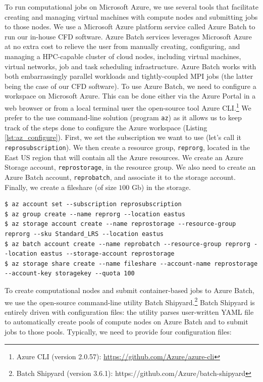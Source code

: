 \documentclass[10pt,journal,compsoc]{IEEEtran}
\begin{document}
To run computational jobs on Microsoft Azure, we use several tools that facilitate creating and managing virtual machines with compute nodes and submitting jobs to those nodes.
We use a Microsoft Azure platform service called Azure Batch to run our in-house CFD software.
Azure Batch services leverages Microsoft Azure at no extra cost to relieve the user from manually creating, configuring, and managing a HPC-capable cluster of cloud nodes, including virtual machines, virtual networks, job and task scheduling infrastructure.
Azure Batch works with both embarrassingly parallel workloads and tightly-coupled MPI jobs (the latter being the case of our CFD software).
To use Azure Batch, we need to configure a workspace on Microsoft Azure.
This can be done either via the Azure Portal in a web browser or from a local terminal user the open-source tool Azure CLI.\footnote{Azure CLI (version 2.0.57): \url{https://github.com/Azure/azure-cli}}
We prefer to the use command-line solution (program \texttt{az}) as it allows us to keep track of the steps done to configure the Azure workspace (Listing \ref{lst:az_configure}).
First, we set the subscription we want to use (let's call it \texttt{reprosubscription}).
We then create a resource group, \texttt{reprorg}, located in the East US region that will contain all the Azure resources.
We create an Azure Storage account, \texttt{reprostorage}, in the resource group.
We also need to create an Azure Batch account, \texttt{reprobatch}, and associate it to the storage account.
Finally, we create a fileshare (of size $100$ Gb) in the storage.

\begin{lstlisting}[label=lst:az_configure,caption={Configure the workspace on Microsoft Azure.}]
$ az account set --subscription reprosubscription
$ az group create --name reprorg --location eastus
$ az storage account create --name reprostorage --resource-group reprorg --sku Standard_LRS --location eastus
$ az batch account create --name reprobatch --resource-group reprorg --location eastus --storage-account reprostorage
$ az storage share create --name fileshare --account-name reprostorage --account-key storagekey --quota 100
\end{lstlisting}

To create computational nodes and submit container-based jobs to Azure Batch, we use the open-source command-line utility Batch Shipyard.\footnote{Batch Shipyard (version 3.6.1): https://github.com/Azure/batch-shipyard}
Batch Shipyard is entirely driven with configuration files: the utility parses user-written YAML file to automatically create pools of compute nodes on Azure Batch and to submit jobs to those pools.
Typically, we need to provide four configuration files:
\end{document}
